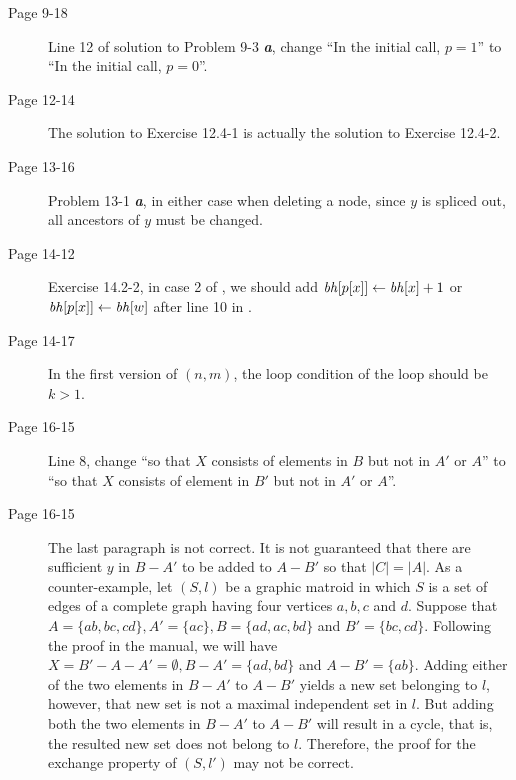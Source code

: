 \documentclass[a4paper, fleqn]{article}
\begin{document}
\begin{description}
\item[Page 9-18]
Line 12 of solution to Problem 9-3 \textbf{\textit{a}}, change ``In
the initial call, $p = 1$'' to ``In the initial call, $p = 0$''.




\item[Page 12-14]
The solution to Exercise 12.4-1 is actually the solution to Exercise
12.4-2.




\item[Page 13-16]
Problem 13-1 \textbf{\textit{a}}, in either case when deleting a node,
since $y$ is spliced out, all ancestors of $y$ must be changed.




\item[Page 14-12]
Exercise 14.2-2, in case 2 of , we should add
$\id{bh}[p[x]] \gets \id{bh}[x] + 1$ or $\id{bh}[p[x]] \gets
\id{bh}[w]$ after line 10 in .




\item[Page 14-17]
In the first version of $(n,m)$, the loop condition of
the  loop should be  $k > 1$.




\item[Page 16-15]
Line 8, change ``so that $X$ consists of elements in $B$ but not in
$A'$ or $A$'' to ``so that $X$ consists of element in $B'$ but not in
$A'$ or $A$''.

\item[Page 16-15]

The last paragraph is not correct. It is not guaranteed that there are
sufficient $y$ in $B-A'$ to be added to $A-B'$ so that $|C| = |A|$. As
a counter-example, let $(S,l)$ be a graphic matroid in which $S$ is a
set of edges of a complete graph having four vertices $a, b, c$ and
$d$. Suppose that $A = \{ab, bc, cd\}, A' = \{ac\}, B = \{ad, ac,
bd\}$ and $B' = \{bc, cd\}$. Following the proof in the manual, we
will have $X = B' - A - A' = \emptyset, B - A' = \{ad, bd\}$ and $A -
B' = \{ab\}$. Adding either of the two elements in $B - A'$ to $A -
B'$ yields a new set belonging to $l$, however, that new set is not a
maximal independent set in $l$. But adding both the two elements in $B
- A'$ to $A - B'$ will result in a cycle, that is, the resulted new
set does not belong to $l$. Therefore, the proof for the exchange
property of $(S,l')$ may not be correct.


\end{description}
\end{document}
